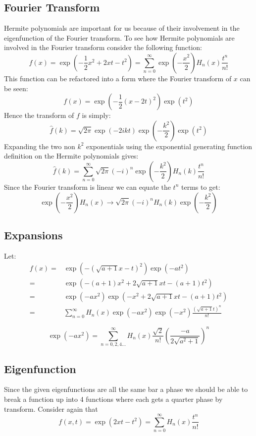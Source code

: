 \documentclass[12pt]{report}
\begin{document}
\subsection{Fourier Transform}
Hermite polynomials are important for us because of their involvement in the eigenfunction of the Fourier transform.
To see how Hermite polynomials are involved in the Fourier transform consider the following function:
\[f(x) = \exp\left(-\frac{1}{2}x^2+2xt-t^2\right) = \sum_{n=0}^\infty\exp\left(-\frac{x^2}{2}\right)H_n(x)\frac{t^n}{n!}\]
This function can be refactored into a form where the Fourier transform of $x$ can be seen:
\[f(x) = \exp\left(-\frac{1}{2}(x-2t)^2\right)\exp(t^2)\]
Hence the transform of $f$ is simply:
\[\hat{f}(k) = \sqrt{2\pi}\exp(-2ikt)\exp\left(-\frac{k^2}{2}\right)\exp(t^2)\]
Expanding the two non $k^2$ exponentials using the exponential generating function definition on the Hermite polynomials gives:
\[\hat{f}(k) = \sum_{n=0}^{\infty}\sqrt{2\pi}(-i)^n\exp\left(-\frac{k^2}{2}\right)H_n(k)\frac{t^n}{n!} \]
Since the Fourier transform is linear we can equate the $t^n$ terms to get:
\[\exp\left(-\frac{x^2}{2}\right)H_n(x) \rightarrow \sqrt{2\pi}(-i)^nH_n(k)\exp\left(-\frac{k^2}{2}\right)\]

\subsection{Expansions}
Let:
\begin{equation*}
\begin{aligned}
	f(x) =& \exp(-(\sqrt{a+1}x-t)^2)\exp(-at^2) \\
	=& \exp(-(a+1)x^2+2\sqrt{a+1}xt-(a+1)t^2)\\
	=& \exp(-ax^2)\exp(-x^2+2\sqrt{a+1}xt-(a+1)t^2)\\
	=& \sum_{n=0}^{\infty}H_n(x)\exp(-ax^2)\exp(-x^2)\frac{(\sqrt{a+1}t)^n}{n!}
\end{aligned}
\end{equation*}

\[\exp(-ax^2) = \sum_{n=0,2,4...}^\infty H_n(x)\frac{\sqrt{2}}{n!}\left(\frac{-a}{2\sqrt{a^2+1}}\right)^n\]

\subsection{Eigenfunction}
Since the given eigenfunctions are all the same bar a phase we should be able to break a function up into 4 functions where each gets a quarter phase by transform.
Consider again that \[f(x,t) = \exp(2xt-t^2) = \sum_{n=0}^\infty H_n(x)\frac{t^n}{n!}\]
\end{document}
